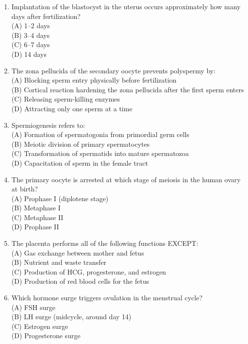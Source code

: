 \documentclass{article}
\begin{document}
\begin{enumerate}[label=Q\arabic*.]
\item Implantation of the blastocyst in the uterus occurs approximately how many days after fertilization?
\\(A) 1--2 days
\\(B) 3--4 days
\\(C) 6--7 days
\\(D) 14 days

\item The zona pellucida of the secondary oocyte prevents polyspermy by:
\\(A) Blocking sperm entry physically before fertilization
\\(B) Cortical reaction hardening the zona pellucida after the first sperm enters
\\(C) Releasing sperm-killing enzymes
\\(D) Attracting only one sperm at a time

\item Spermiogenesis refers to:
\\(A) Formation of spermatogonia from primordial germ cells
\\(B) Meiotic division of primary spermatocytes
\\(C) Transformation of spermatids into mature spermatozoa
\\(D) Capacitation of sperm in the female tract

\item The primary oocyte is arrested at which stage of meiosis in the human ovary at birth?
\\(A) Prophase I (diplotene stage)
\\(B) Metaphase I
\\(C) Metaphase II
\\(D) Prophase II

\item The placenta performs all of the following functions EXCEPT:
\\(A) Gas exchange between mother and fetus
\\(B) Nutrient and waste transfer
\\(C) Production of HCG, progesterone, and estrogen
\\(D) Production of red blood cells for the fetus

\item Which hormone surge triggers ovulation in the menstrual cycle?
\\(A) FSH surge
\\(B) LH surge (midcycle, around day 14)
\\(C) Estrogen surge
\\(D) Progesterone surge


\end{enumerate}
\end{document}
